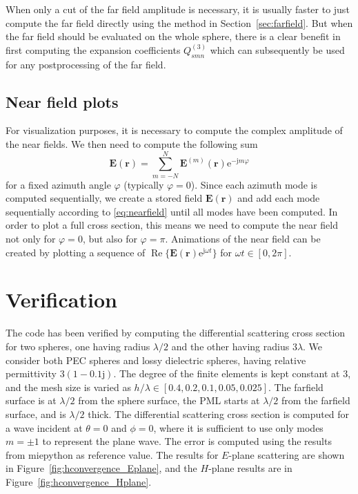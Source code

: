 \documentclass[a4paper,12pt]{article}
\renewcommand{\vec}[1]{\boldsymbol{#1}}
\newcommand{\mrm}[1]{\mathrm{#1}}
\renewcommand{\Re}{\operatorname{Re}}
\newcommand{\ju}{\mrm{j}}
\newcommand{\eu}{\mrm{e}}
\newcommand{\Ev}{\vec{E}}
\newcommand{\rv}{\vec{r}}
\begin{document}
When only a cut of the far field amplitude is necessary, it is usually
faster to just compute the far field directly using the method in
Section~\ref{sec:farfield}. But when the far field should be evaluated
on the whole sphere, there is a clear benefit in first computing the
expansion coefficients $Q_{smn}^{(3)}$ which can subsequently be used
for any postprocessing of the far field.


\subsection{Near field plots}
\label{sec:nearfields}

For visualization purposes, it is necessary to compute the complex
amplitude of the near fields. We then need to compute the following
sum
\begin{equation}
  \Ev(\rv) = \sum_{m=-N}^{N}\Ev^{(m)}(\rv)\eu^{-\ju m\varphi}
  \label{eq:nearfield}
\end{equation}
for a fixed azimuth angle $\varphi$ (typically $\varphi=0$). Since
each azimuth mode is computed sequentially, we create a stored field
$\Ev(\rv)$ and add each mode sequentially according to
\eqref{eq:nearfield} until all modes have been computed. In order to
plot a full cross section, this means we need to compute the near
field not only for $\varphi=0$, but also for $\varphi=\pi$. Animations
of the near field can be created by plotting a sequence of 
$\Re\{\Ev(\rv)\eu^{\ju\omega t}\}$ for $\omega t\in[0,2\pi]$.



\section{Verification}
\label{sec:verification}

The code has been verified by computing the differential scattering
cross section for two spheres, one having radius $\lambda/2$ and the
other having radius $3\lambda$. We consider both PEC spheres and lossy
dielectric spheres, having relative permittivity $3(1-0.1\ju)$. The
degree of the finite elements is kept constant at 3, and the mesh size
is varied as $h/\lambda \in [0.4, 0.2, 0.1, 0.05, 0.025]$. The
farfield surface is at $\lambda/2$ from the sphere surface, the PML
starts at $\lambda/2$ from the farfield surface, and is $\lambda/2$
thick. The differential scattering cross section is computed for a
wave incident at $\theta=0$ and $\phi=0$, where it is sufficient to
use only modes $m=\pm1$ to represent the plane wave. The error is
computed using the results from miepython \cite{prahl_miepython_2025}
as reference value. The results for $E$-plane scattering are shown in
Figure~\ref{fig:hconvergence_Eplane}, and the $H$-plane results are in
Figure~\ref{fig:hconvergence_Hplane}.
\end{document}
